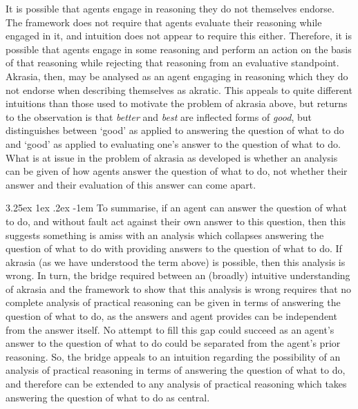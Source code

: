 \documentclass[10pt]{article}
\makeatletter
\renewcommand\paragraph{\@startsection{paragraph}{5}{\z@}%
  {3.25ex \@plus1ex \@minus.2ex}%
  {-1em}%
  {\normalfont\normalsize\bfseries}}
\makeatother
\begin{document}
It is possible that agents engage in reasoning they do not themselves endorse.
The framework does not require that agents evaluate their reasoning while engaged in it, and intuition does not appear to require this either.
Therefore, it is possible that agents engage in some reasoning and perform an action on the basis of that reasoning while rejecting that reasoning from an evaluative standpoint.
Akrasia, then, may be analysed as an agent engaging in reasoning which they do not endorse when describing themselves as akratic.
This appeals to quite different intuitions than those used to motivate the problem of akrasia above, but returns to the observation is that \emph{better} and \emph{best} are inflected forms of \emph{good}, but distinguishes between `good' as applied to answering the question of what to do and `good' as applied to evaluating one's answer to the question of what to do.
What is at issue in the problem of akrasia as developed is whether an analysis can be given of how agents answer the question of what to do, not whether their answer and their evaluation of this answer can come apart.

\paragraph{ }
To summarise, if an agent can answer the question of what to do, and without fault act against their own answer to this question, then this suggests something is amiss with an analysis which collapses answering the question of what to do with providing answers to the question of what to do.
If akrasia (as we have understood the term above) is possible, then this analysis is wrong.
In turn, the bridge required between an (broadly) intuitive understanding of akrasia and the framework to show that this analysis is wrong requires that no complete analysis of practical reasoning can be given in terms of answering the question of what to do, as the answers and agent provides can be independent from the answer itself.
No attempt to fill this gap could succeed as an agent's answer to the question of what to do could be separated from the agent's prior reasoning.
So, the bridge appeals to an intuition regarding the possibility of an analysis of practical reasoning in terms of answering the question of what to do, and therefore can be extended to any analysis of practical reasoning which takes answering the question of what to do as central.

\end{document}
